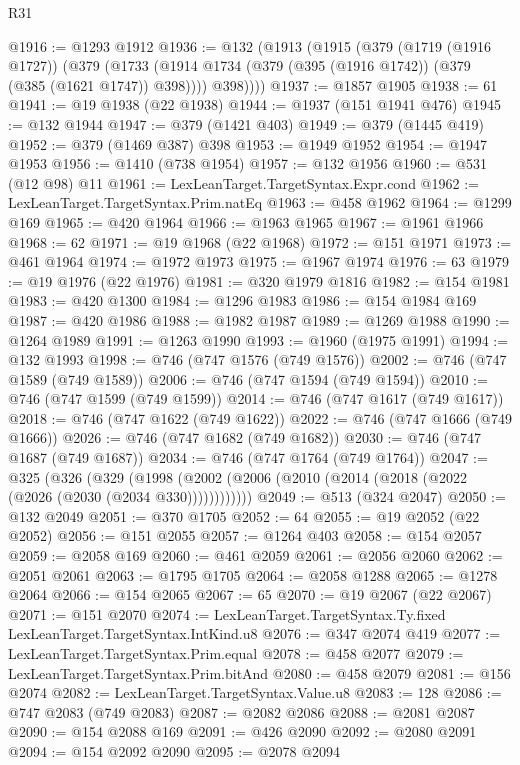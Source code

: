\begin{lexlean}{R31}
\begin{coremodule}
@1916 := @1293 @1912
@1936 := @132
    (@1913
      (@1915
        (@379
          (@1719 (@1916 @1727))
          (@379
            (@1733 (@1914 @1734 (@379 (@395 (@1916 @1742)) (@379 (@385 (@1621 @1747)) @398))))
            @398))))
@1937 := @1857 @1905
@1938 := 61
@1941 := @19 @1938 (@22 @1938)
@1944 := @1937 (@151 @1941 @476)
@1945 := @132 @1944
@1947 := @379 (@1421 @403)
@1949 := @379 (@1445 @419)
@1952 := @379 (@1469 @387) @398
@1953 := @1949 @1952
@1954 := @1947 @1953
@1956 := @1410 (@738 @1954)
@1957 := @132 @1956
@1960 := @531 (@12 @98) @11
@1961 := LexLeanTarget.TargetSyntax.Expr.cond
@1962 := LexLeanTarget.TargetSyntax.Prim.natEq
@1963 := @458 @1962
@1964 := @1299 @169
@1965 := @420 @1964
@1966 := @1963 @1965
@1967 := @1961 @1966
@1968 := 62
@1971 := @19 @1968 (@22 @1968)
@1972 := @151 @1971
@1973 := @461 @1964
@1974 := @1972 @1973
@1975 := @1967 @1974
@1976 := 63
@1979 := @19 @1976 (@22 @1976)
@1981 := @320 @1979 @1816
@1982 := @154 @1981
@1983 := @420 @1300
@1984 := @1296 @1983
@1986 := @154 @1984 @169
@1987 := @420 @1986
@1988 := @1982 @1987
@1989 := @1269 @1988
@1990 := @1264 @1989
@1991 := @1263 @1990
@1993 := @1960 (@1975 @1991)
@1994 := @132 @1993
@1998 := @746 (@747 @1576 (@749 @1576))
@2002 := @746 (@747 @1589 (@749 @1589))
@2006 := @746 (@747 @1594 (@749 @1594))
@2010 := @746 (@747 @1599 (@749 @1599))
@2014 := @746 (@747 @1617 (@749 @1617))
@2018 := @746 (@747 @1622 (@749 @1622))
@2022 := @746 (@747 @1666 (@749 @1666))
@2026 := @746 (@747 @1682 (@749 @1682))
@2030 := @746 (@747 @1687 (@749 @1687))
@2034 := @746 (@747 @1764 (@749 @1764))
@2047 := @325
    (@326
      (@329 (@1998 (@2002 (@2006 (@2010 (@2014 (@2018 (@2022 (@2026 (@2030 (@2034 @330))))))))))))
@2049 := @513 (@324 @2047)
@2050 := @132 @2049
@2051 := @370 @1705
@2052 := 64
@2055 := @19 @2052 (@22 @2052)
@2056 := @151 @2055
@2057 := @1264 @403
@2058 := @154 @2057
@2059 := @2058 @169
@2060 := @461 @2059
@2061 := @2056 @2060
@2062 := @2051 @2061
@2063 := @1795 @1705
@2064 := @2058 @1288
@2065 := @1278 @2064
@2066 := @154 @2065
@2067 := 65
@2070 := @19 @2067 (@22 @2067)
@2071 := @151 @2070
@2074 := LexLeanTarget.TargetSyntax.Ty.fixed LexLeanTarget.TargetSyntax.IntKind.u8
@2076 := @347 @2074 @419
@2077 := LexLeanTarget.TargetSyntax.Prim.equal
@2078 := @458 @2077
@2079 := LexLeanTarget.TargetSyntax.Prim.bitAnd
@2080 := @458 @2079
@2081 := @156 @2074
@2082 := LexLeanTarget.TargetSyntax.Value.u8
@2083 := 128
@2086 := @747 @2083 (@749 @2083)
@2087 := @2082 @2086
@2088 := @2081 @2087
@2090 := @154 @2088 @169
@2091 := @426 @2090
@2092 := @2080 @2091
@2094 := @154 @2092 @2090
@2095 := @2078 @2094

\end{coremodule}
\end{lexlean}
